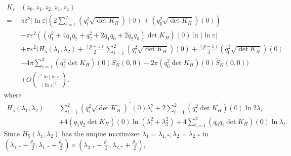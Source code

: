 \documentclass[12pt,reqno]{amsart}
\numberwithin{equation}{section}
\theoremstyle{definition}
\theoremstyle{remark}
\begin{document}
\begin{equation} \label{705}
\begin{split}
K_\varepsilon&\left (z_0,z_1,z_2,z_3,z_4\right )\\
=&\pi\varepsilon^2|\ln\varepsilon|\left( 2\sum_{i=1}^2\left( q_i^2\sqrt{\det K_H}\right) (0)+\left( q_0^2\sqrt{\det K_H}\right) (0) \right) \\
&-\pi\varepsilon^2\left( \left( q_1^2+4q_1q_2+q_2^2+2q_1q_0+2q_2q_0 \right) \det K_H \right)(0)\ln|\ln\varepsilon|\\
&+\pi\varepsilon^2\bigg(    H_5(\lambda_1,\lambda_2)+\frac{(p-1)}{2}   \sum_{i=1}^2\left( q_i^2\sqrt{\det K_H}\right) (0)   + \frac{(p-1)}{4}\left( q_0^2\sqrt{\det K_H}\right) (0)  \\
& -4\pi  \sum_{i=1}^2 \left( q_i^2  \det K_H\right)(0) \bar{S}_K(0,0)-2\pi   \left( q_0^2  \det K_H\right)(0) \bar{S}_K(0,0)\bigg) \\ 
&+O\left( \frac{\varepsilon^2\ln|\ln\varepsilon|}{|\ln\varepsilon|^{\frac{1}{2}}}\right).
\end{split}
\end{equation}
where
\begin{equation*} 
\begin{split}
H_5(\lambda_1,\lambda_2)=&\sum_{i=1}^2 \left(q_i^2\sqrt{\det K_H} \right)^{''}(0 )\lambda_i^2+2\sum_{i=1}^2\left( q_i^2 \det K_H\right)(0)\ln 2\lambda_i \\
&+4\left( q_1q_2  \det K_H\right)(0)\ln (\lambda_1^2+\lambda_2^2)+4\sum_{i=1}^2\left( q_0q_i \det K_H\right)(0)\ln \lambda_i .
\end{split}
\end{equation*}
$$$$
Since	$ H_5(\lambda_1,\lambda_2) $
has the unqiue maximizer $ \lambda_1=\lambda_{1,*}, \lambda_2=\lambda_{2,*} $ in $  \left( \lambda_{1,*}-\frac{\rho_0}{2}, \lambda_{1,*}+\frac{\rho_0}{2}\right)\times \left( \lambda_{2,*}-\frac{\rho_0}{2}, \lambda_{2,*}+\frac{\rho_0}{2}\right) $,  
%
\end{document}
